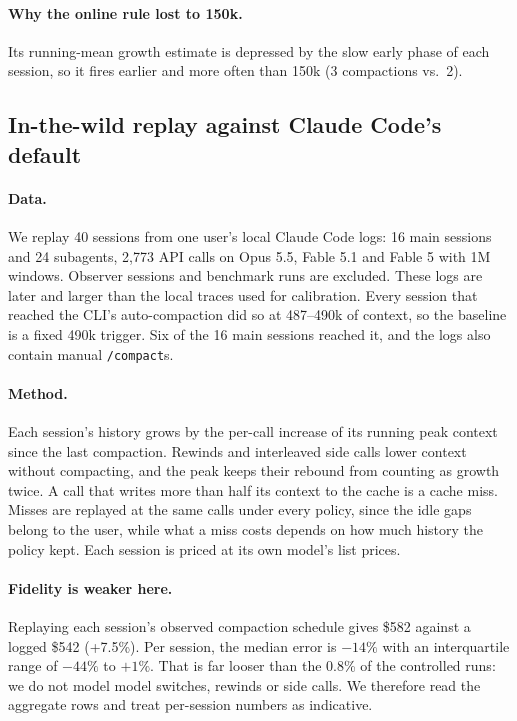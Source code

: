 \documentclass[11pt]{article}
\begin{document}
\paragraph{Why the online rule lost to 150k.} Its running-mean growth estimate is depressed by the slow early phase of each session, so it fires earlier and more often than 150k (3 compactions vs.\ 2).

\subsection{In-the-wild replay against Claude Code's default}\label{sec:wild}
\paragraph{Data.} We replay 40 sessions from one user's local Claude Code logs: 16 main sessions and 24 subagents, 2{,}773 API calls on Opus 5.5, Fable 5.1 and Fable 5 with 1M windows. Observer sessions and benchmark runs are excluded. These logs are later and larger than the local traces used for calibration. Every session that reached the CLI's auto-compaction did so at 487--490k of context, so the baseline is a fixed 490k trigger. Six of the 16 main sessions reached it, and the logs also contain manual \texttt{/compact}s.

\paragraph{Method.} Each session's history grows by the per-call increase of its running peak context since the last compaction. Rewinds and interleaved side calls lower context without compacting, and the peak keeps their rebound from counting as growth twice. A call that writes more than half its context to the cache is a cache miss. Misses are replayed at the same calls under every policy, since the idle gaps belong to the user, while what a miss costs depends on how much history the policy kept. Each session is priced at its own model's list prices.

\paragraph{Fidelity is weaker here.} Replaying each session's observed compaction schedule gives \$582 against a logged \$542 (+7.5\%). Per session, the median error is $-14\%$ with an interquartile range of $-44\%$ to $+1\%$. That is far looser than the 0.8\% of the controlled runs: we do not model model switches, rewinds or side calls. We therefore read the aggregate rows and treat per-session numbers as indicative.
\end{document}
